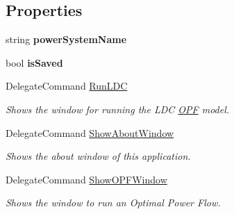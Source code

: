 \subsection*{Properties}
\begin{DoxyCompactItemize}
\item 
string {\bfseries power\+System\+Name}\hypertarget{class_power_system_planning_wpf_app_1_1_models_1_1_power_system_view_model_a92f80f60ede4570a75be00afcb80fad0}{}\label{class_power_system_planning_wpf_app_1_1_models_1_1_power_system_view_model_a92f80f60ede4570a75be00afcb80fad0}

\item 
bool {\bfseries is\+Saved}\hypertarget{class_power_system_planning_wpf_app_1_1_models_1_1_power_system_view_model_a0c12e1a579772829f5d338323ed3fd8e}{}\label{class_power_system_planning_wpf_app_1_1_models_1_1_power_system_view_model_a0c12e1a579772829f5d338323ed3fd8e}

\item 
Delegate\+Command \hyperlink{class_power_system_planning_wpf_app_1_1_models_1_1_power_system_view_model_a823b557451c5d1919795bd7f66cae55f}{Run\+L\+DC}
\begin{DoxyCompactList}\small\item\em Shows the window for running the L\+DC \hyperlink{namespace_power_system_planning_wpf_app_1_1_o_p_f}{O\+PF} model. \end{DoxyCompactList}\item 
Delegate\+Command \hyperlink{class_power_system_planning_wpf_app_1_1_models_1_1_power_system_view_model_a18f9d1046adb9bfd67bcdc5c07cfcc2b}{Show\+About\+Window}
\begin{DoxyCompactList}\small\item\em Shows the about window of this application. \end{DoxyCompactList}\item 
Delegate\+Command \hyperlink{class_power_system_planning_wpf_app_1_1_models_1_1_power_system_view_model_a1a0b9565c51f953742c9ce376eaa1f88}{Show\+O\+P\+F\+Window}
\begin{DoxyCompactList}\small\item\em Shows the window to run an Optimal Power Flow. \end{DoxyCompactList}\end{DoxyCompactItemize}


